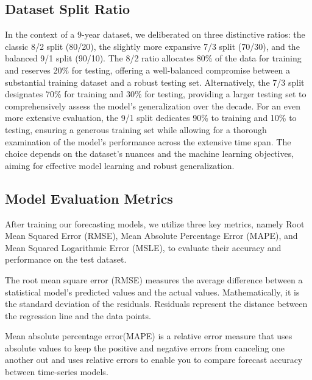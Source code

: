 \documentclass{ieeeojies}
\begin{document}
\subsection{Dataset Split Ratio}
In the context of a 9-year dataset, we deliberated on three distinctive ratios: the classic 8/2 split (80/20), the slightly more expansive 7/3 split (70/30), and the balanced 9/1 split (90/10). The 8/2 ratio allocates 80\% of the data for training and reserves 20\% for testing, offering a well-balanced compromise between a substantial training dataset and a robust testing set. Alternatively, the 7/3 split designates 70\% for training and 30\% for testing, providing a larger testing set to comprehensively assess the model's generalization over the decade. For an even more extensive evaluation, the 9/1 split dedicates 90\% to training and 10\% to testing, ensuring a generous training set while allowing for a thorough examination of the model's performance across the extensive time span. The choice depends on the dataset's nuances and the machine learning objectives, aiming for effective model learning and robust generalization.

\subsection{Model Evaluation Metrics}
After training our forecasting models, we utilize three key metrics, namely Root Mean Squared Error (RMSE), Mean Absolute Percentage Error (MAPE), and Mean Squared Logarithmic Error (MSLE), to evaluate their accuracy and performance on the test dataset.

The root mean square error (RMSE) measures the average difference between a statistical model’s predicted values and the actual values. Mathematically, it is the standard deviation of the residuals. Residuals represent the distance between the regression line and the data points.\cite{r11}

Mean absolute percentage error(MAPE) is a relative error measure that uses absolute values to keep the positive and negative errors from canceling one another out and uses relative errors to enable you to compare forecast accuracy between time-series models.\cite{r12}
\end{document}
